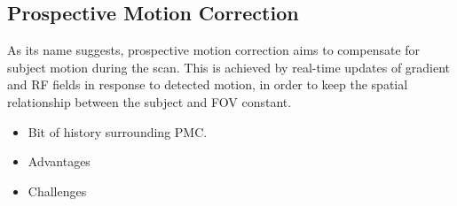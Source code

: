 \documentclass[class=article, crop=false]{standalone}
\begin{document}
\subsection{Prospective Motion Correction}
As its name suggests, prospective motion correction aims to compensate for subject motion during the scan. This is achieved by real-time updates of gradient and RF fields in response to detected motion, in order to keep the spatial relationship between the subject and FOV constant. 

\begin{itemize}
	\item Bit of history surrounding PMC.
	\item Advantages
	\item Challenges
\end{itemize}
\end{document}
